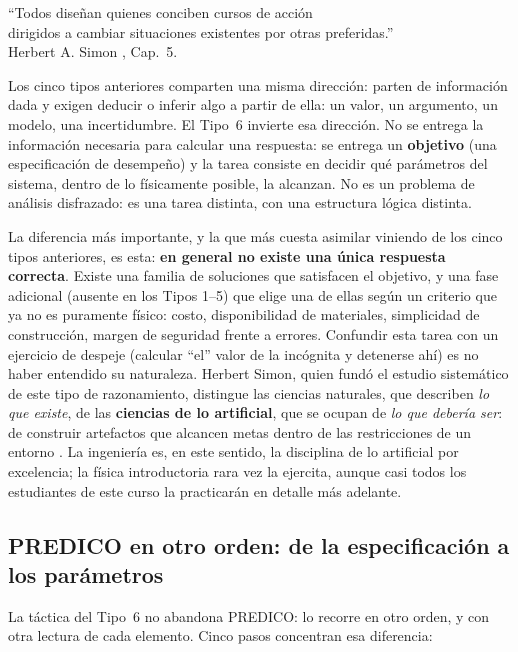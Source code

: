 \documentclass[11pt]{book}
\begin{document}
{\small
\begin{flushright}
	``Todos diseñan quienes conciben cursos de acción\\
	dirigidos a cambiar situaciones existentes por otras preferidas.''\\
	Herbert A. Simon \cite{Simon1996}, Cap.\ 5.
\end{flushright}
}

\medskip
Los cinco tipos anteriores comparten una misma dirección: parten de información dada y exigen deducir o inferir algo a partir de ella: un valor, un argumento, un modelo, una incertidumbre. El Tipo~6 invierte esa dirección. No se entrega la información necesaria para calcular una respuesta: se entrega un {\bf objetivo} (una especificación de desempeño) y la tarea consiste en decidir qué parámetros del sistema, dentro de lo físicamente posible, la alcanzan. No es un problema de análisis disfrazado: es una tarea distinta, con una estructura lógica distinta.

\medskip
La diferencia más importante, y la que más cuesta asimilar viniendo de los cinco tipos anteriores, es esta: {\bf en general no existe una única respuesta correcta}. Existe una familia de soluciones que satisfacen el objetivo, y una fase adicional (ausente en los Tipos 1--5) que elige una de ellas según un criterio que ya no es puramente físico: costo, disponibilidad de materiales, simplicidad de construcción, margen de seguridad frente a errores. Confundir esta tarea con un ejercicio de despeje (calcular ``el'' valor de la incógnita y detenerse ahí) es no haber entendido su naturaleza. Herbert Simon, quien fundó el estudio sistemático de este tipo de razonamiento, distingue las ciencias naturales, que describen {\it lo que existe}, de las {\bf ciencias de lo artificial}, que se ocupan de {\it lo que debería ser}: de construir artefactos que alcancen metas dentro de las restricciones de un entorno \cite{Simon1996}. La ingeniería es, en este sentido, la disciplina de lo artificial por excelencia; la física introductoria rara vez la ejercita, aunque casi todos los estudiantes de este curso la practicarán en detalle más adelante.

\subsection*{PREDICO en otro orden: de la especificación a los parámetros}

La táctica del Tipo~6 no abandona PREDICO: lo recorre en otro orden, y con otra lectura de cada elemento. Cinco pasos concentran esa diferencia:
\end{document}
